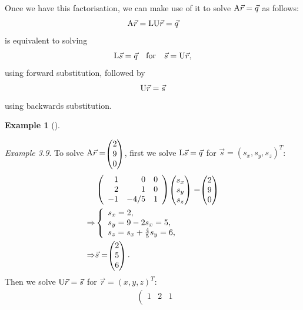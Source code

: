 \documentclass[
  a4paper,
  DIV=11,
  numbers=noendperiod,
  oneside]{scrreprt}
\theoremstyle{definition}
\newtheorem{example}{Example}[chapter]
\theoremstyle{remark}
\begin{document}
Once we have this factorisation, we can make use of it to solve
\({\rm A}\vec{r}=\vec{q}\) as follows:
\[{\rm A}\vec{r}={\rm L}{\rm U}\vec{r}=\vec{q}\] is equivalent to
solving
\[{\rm L}\vec{s}=\vec{q}\quad\textrm{for}\quad\vec{s}={\rm U}\vec{r},\]
using forward substitution, followed by \[{\rm U}\vec{r}=\vec{s}\] using
backwards substitution.

\begin{example}[]\protect\hypertarget{exm-LUfactor2}{}\label{exm-LUfactor2}

\emph{Example 3.9}. To solve
\({\rm A}\vec{r}= \scriptscriptstyle \begin{pmatrix}    2\\ 9 \\ 0  \end{pmatrix} \textstyle\),
first we solve \({\rm L}\vec{s}=\vec{q}\) for
\(\vec{s}=(s_{x},s_{y},s_{z})^{T}\): \[\begin{aligned}
 & \left( \begin{array}{rrr}
 1  & 0  & 0  \\
 2  & 1  & 0  \\
 -1 & -4/5 & 1 
\end{array} \right) \scriptstyle \begin{pmatrix}   s_{x}\\ s_{y} \\ s_{z}  \end{pmatrix} \textstyle = \scriptstyle \begin{pmatrix}    2\\ 9 \\ 0  \end{pmatrix} \textstyle \\
\Rightarrow & \left\{ \begin{array}{l}
s_{x} =2, \\
s_{y} = 9-2s_{x} = 5,\\
s_{z} = s_{x}+\frac{4}{5}s_{y}=6,
\end{array} \right. \\
\Rightarrow &
 \vec{s}= \scriptstyle \begin{pmatrix}    2\\ 5 \\ 6  \end{pmatrix} \textstyle. 
\end{aligned}\] Then we solve \({\rm U}\vec{r}=\vec{s}\) for
\(\vec{r}=(x,y,z)^{T}\): \[\begin{aligned}
& \left( \begin{array}{rrr}
1  & 2  & 1  \\

\end{array}
\end{aligned}\]
\end{example}
\end{document}
